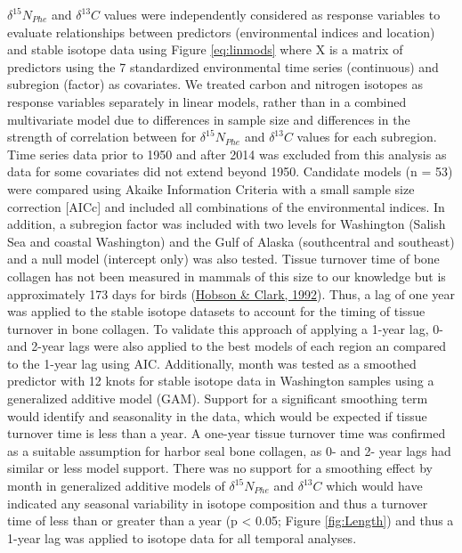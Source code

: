 \documentclass [11pt, proquest] {uwthesis}[2015/03/03]
\begin{document}
\(\delta^{15}N_{Phe}\) and \(\delta^{13}C\) values were independently considered as response variables to evaluate relationships between predictors (environmental indices and location) and stable isotope data using Figure \eqref{eq:linmods} where X is a matrix of predictors using the 7 standardized environmental time series (continuous) and subregion (factor) as covariates. We treated carbon and nitrogen isotopes as response variables separately in linear models, rather than in a combined multivariate model due to differences in sample size and differences in the strength of correlation between for \(\delta^{15}N_{Phe}\) and \(\delta^{13}C\) values for each subregion. Time series data prior to 1950 and after 2014 was excluded from this analysis as data for some covariates did not extend beyond 1950. Candidate models (n = 53) were compared using Akaike Information Criteria with a small sample size correction {[}AICc{]} and included all combinations of the environmental indices. In addition, a subregion factor was included with two levels for Washington (Salish Sea and coastal Washington) and the Gulf of Alaska (southcentral and southeast) and a null model (intercept only) was also tested. Tissue turnover time of bone collagen has not been measured in mammals of this size to our knowledge but is approximately 173 days for birds (\protect\hyperlink{ref-Hobson1992}{Hobson \& Clark, 1992}). Thus, a lag of one year was applied to the stable isotope datasets to account for the timing of tissue turnover in bone collagen. To validate this approach of applying a 1-year lag, 0- and 2-year lags were also applied to the best models of each region an compared to the 1-year lag using AIC. Additionally, month was tested as a smoothed predictor with 12 knots for stable isotope data in Washington samples using a generalized additive model (GAM). Support for a significant smoothing term would identify and seasonality in the data, which would be expected if tissue turnover time is less than a year. A one-year tissue turnover time was confirmed as a suitable assumption for harbor seal bone collagen, as 0- and 2- year lags had similar or less model support. There was no support for a smoothing effect by month in generalized additive models of \(\delta^{15}N_{Phe}\) and \(\delta^{13}C\) which would have indicated any seasonal variability in isotope composition and thus a turnover time of less than or greater than a year (p \textless{} 0.05; Figure \ref{fig:Length}) and thus a 1-year lag was applied to isotope data for all temporal analyses.
\end{document}

